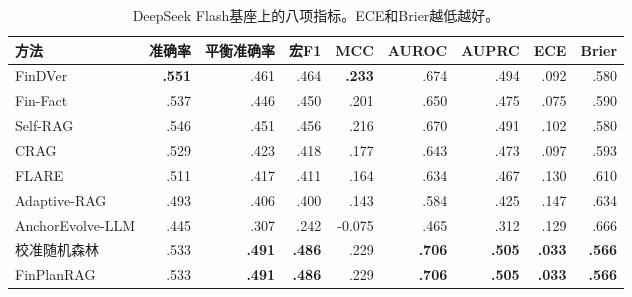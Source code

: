 \begin{table}[htbp]
\centering
{}
\setlength{\tabcolsep}{3pt}
\caption{DeepSeek Flash基座上的八项指标。ECE和Brier越低越好。}
\label{tab:fullmetrics}
\begin{tabular}{lrrrrrrrr}
\toprule
方法 & 准确率 & 平衡准确率 & 宏F1 & MCC & AUROC & AUPRC & ECE & Brier \\
\midrule
FinDVer & \textbf{.551} & .461 & .464 & \textbf{.233} & .674 & .494 & .092 & .580 \\
Fin-Fact & .537 & .446 & .450 & .201 & .650 & .475 & .075 & .590 \\
Self-RAG & .546 & .451 & .456 & .216 & .670 & .491 & .102 & .580 \\
CRAG & .529 & .423 & .418 & .177 & .643 & .473 & .097 & .593 \\
FLARE & .511 & .417 & .411 & .164 & .634 & .467 & .130 & .610 \\
Adaptive-RAG & .493 & .406 & .400 & .143 & .584 & .425 & .147 & .634 \\
AnchorEvolve-LLM & .445 & .307 & .242 & -0.075 & .465 & .312 & .129 & .666 \\
校准随机森林 & .533 & \textbf{.491} & \textbf{.486} & .229 & \textbf{.706} & \textbf{.505} & \textbf{.033} & \textbf{.566} \\
FinPlanRAG & .533 & \textbf{.491} & \textbf{.486} & .229 & \textbf{.706} & \textbf{.505} & \textbf{.033} & \textbf{.566} \\
\bottomrule
\end{tabular}
\end{table}
